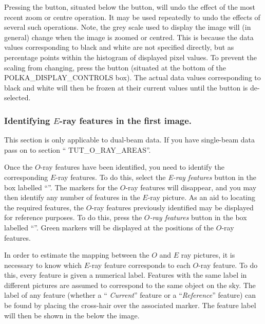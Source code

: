 Pressing the  button, situated below
the  button, will undo the effect of the
most recent zoom or centre operation. It may be used repeatedly to undo
the effects of several such operations. Note, the grey scale used to
display the image will (in general) change when the image is zoomed or
centred. This is because the data values corresponding to black and
white are not specified directly, but as percentage points within the
histogram of displayed pixel values. To prevent the scaling from
changing, press the 
button (situated at the bottom of the 
{POLKA_DISPLAY_CONTROLS} box). The actual data values corresponding to
black and white will then be frozen at their current values until the
button is de-selected.

\subsubsection {Identifying $E$-ray features in the first image.}
This section is only applicable to dual-beam data. If you have
single-beam data pass on to section ``
{TUT_O_RAY_AREAS}''.

Once the $O$-ray features have been identified, you need to identify the
corresponding $E$-ray features. To do this, select the {\em E-ray
features} button in the box labelled ``''. The markers for the $O$-ray features will
disappear, and you may then identify any number of features in the
$E$-ray picture. As an aid to locating the required features, the $O$-ray
features previously identified may be displayed for reference purposes. To
do this, press the {\em $O$-ray features} button in the box labelled
``''. Green markers will be
displayed at the positions of the $O$-ray features.

In order to estimate the mapping between the $O$ and $E$ ray pictures, it
is necessary to know which $E$-ray feature corresponds to each $O$-ray
feature. To do this, every feature is given a numerical label. Features
with the same label in different pictures are assumed to correspond to
the same object on the sky. The label of any feature (whether a ``{\em
Current}'' feature or a ``{\em Reference}'' feature) can be found by
placing the cross-hair over the associated marker. The feature label
will then be shown in the  below 
the image.

